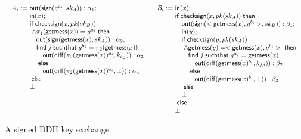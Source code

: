 \begin{figure}
  \[
    \begin{array}{cc}
      \begin{array}[t]{l@{~}l}
        A_i := & \aout{\mysign(g^{a_i},sk_A)} : \alpha_1; \\
        &\ain{x}; \\
        & \myif \mycsign(x,pk(sk_B)) \\
        & ~ \wedge \pi_1(\mygetmess(x))=g^{a_i}  \mythen \\
        & \quad \aout{\mysign(\mygetmess(x),sk_A) } : \alpha_2; \\
        & \quad \myfind j \mysuchthat g^{b_j} = \pi_2(\mygetmess(x)) \\
        & \qquad \aout{\diff{\pi_2(\mygetmess(x))^{a_i}}{k_{i,j}}} : \alpha_3\\
        & \quad \myelse \\
        & \qquad \aout{\diff{\pi_2(\mygetmess(x))^{a_i}}{\bot}}  : \alpha_4 \\
        & \myelse \\
        & \bot
      \end{array}
      &
      \begin{array}[t]{l@{~}l}
        B_i := &\ain{x}; \\
        & \myif \mycsign(x,pk(sk_A)) \mythen \\
        & \quad \aout{\mysign(<\mygetmess(x), g^{b_i}>,sk_B)} : \beta_1; \\
        & \quad \ain{y}; \\
        & \quad \myif \mycsign(y,pk(sk_A))\\
        & \quad ~ \wedge \mygetmess(y) = <\mygetmess(x), g^{b_i}> \mythen \\
        & \quad \quad \myfind j \mysuchthat g^{a_j} = \mygetmess(x) \\
        & \quad \qquad \aout{\diff{\mygetmess(x)^{b_i}}{k_{j,i}}} : \beta_2 \\
        & \quad \quad \myelse \\
        & \quad \qquad \aout{\diff{\mygetmess(x)^{b_i}}{\bot}} : \beta_3 \\
        & \quad \myelse \\
        & \quad \bot \\
        & \myelse \\
        & \bot
      \end{array}
    \end{array}
  \]
  \label{fig:signed_ddh}
  \caption{A signed DDH key exchange}
\end{figure}

